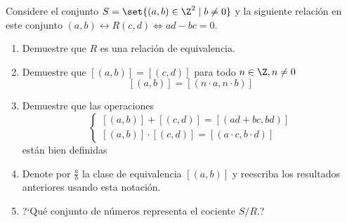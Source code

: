 \begin{problema}
	Considere el conjunto $S=\set{(a,b)\in \Z^{2}\mid b\neq0}$ y la siguiente relación en este conjunto
	$
	(a,b)\rel{R}(c,d) \iff ad-bc=0.
	$
	
	\begin{enumerate}
		\item Demuestre que $R$ es una relación de equivalencia.
		\item Demuestre que $[(a,b)]=[(c,d)]$ para todo $n\in\Z, n \neq 0$
		$$
		[(a,b)]=[(n\cdot a, n\cdot b)]
		$$
		\item Demuestre que las operaciones
		$$
		\begin{cases}
			[(a,b)]+[(c,d)]=[(ad+bc,bd)] \\
			[(a,b)]\cdot[(c,d)]=[(a\cdot c, b \cdot d)]
		\end{cases}
		$$ están bien definidas
		\item Denote por $\frac{a}{b}$ la clase de equivalencia $[(a,b)]$ y reescriba los resultados anteriores usando esta notación.
		\item ?`Qu\'e conjunto de números representa el cociente $S/R.$?
	\end{enumerate}
\end{problema}



